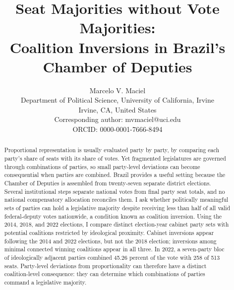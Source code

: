 \documentclass[11pt]{article}
\title{Seat Majorities without Vote Majorities:\\[0.3em]Coalition Inversions in Brazil's Chamber of Deputies}
\author{
Marcelo V. Maciel\\
Department of Political Science, University of California, Irvine\\
Irvine, CA, United States\\
Corresponding author: mvmaciel@uci.edu\\
ORCID: 0000-0001-7666-8494 }
\date{}
\begin{document}
\maketitle

\begin{abstract}
  Proportional representation is usually evaluated party by party, by comparing
each party's share of seats with its share of votes. Yet fragmented
legislatures are governed through combinations of parties, so small
party-level deviations can become consequential when parties are combined.
Brazil provides a useful setting because the Chamber of Deputies is assembled
from twenty-seven separate district elections. Several institutional steps
separate national votes from final party seat totals, and no national
compensatory allocation reconciles them. I ask whether politically meaningful
sets of parties can hold a legislative majority despite receiving less than
half of all valid federal-deputy votes nationwide, a condition known as
coalition inversion. Using the 2014, 2018, and 2022 elections, I compare distinct
election-year cabinet party sets with potential coalitions restricted by
ideological proximity. Cabinet inversions appear
following the 2014 and 2022 elections, but not the 2018 election; inversions
among minimal connected winning coalitions appear in all three. In 2022, a seven-party bloc of ideologically adjacent
parties combined 45.26 percent of
the vote with 258 of 513 seats. Party-level deviations from proportionality can therefore
have a distinct coalition-level consequence: they can determine which
combinations of parties command a legislative majority.


\end{abstract}
\end{document}
